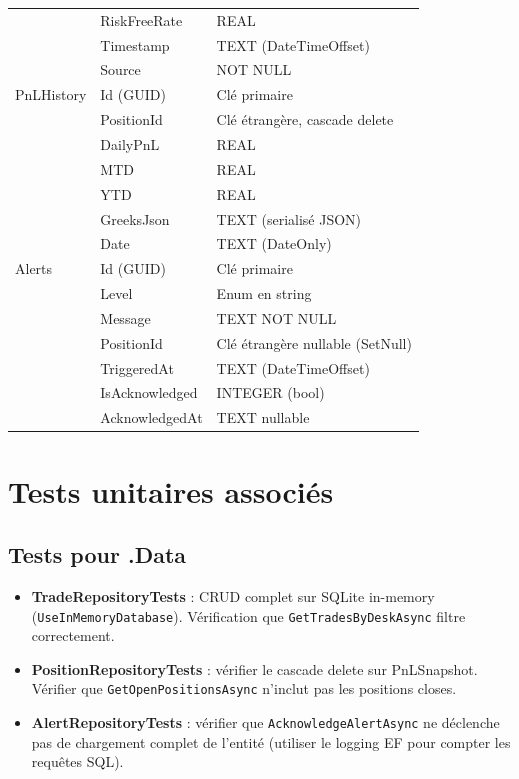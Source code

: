\documentclass[a4paper,11pt]{article}
\newcommand{\cs}[1]{\texttt{\color{codeinline}#1}}
\begin{document}
\begin{center}
\begin{tabularx}{\textwidth}{>{\ttfamily}l >{\ttfamily}l X}
           & RiskFreeRate & REAL \\
           & Timestamp & TEXT (DateTimeOffset) \\
           & Source & NOT NULL \\
\midrule
PnLHistory & Id (GUID) & Clé primaire \\
           & PositionId & Clé étrangère, cascade delete \\
           & DailyPnL & REAL \\
           & MTD & REAL \\
           & YTD & REAL \\
           & GreeksJson & TEXT (serialisé JSON) \\
           & Date & TEXT (DateOnly) \\
\midrule
Alerts & Id (GUID) & Clé primaire \\
       & Level & Enum en string \\
       & Message & TEXT NOT NULL \\
       & PositionId & Clé étrangère nullable (SetNull) \\
       & TriggeredAt & TEXT (DateTimeOffset) \\
       & IsAcknowledged & INTEGER (bool) \\
       & AcknowledgedAt & TEXT nullable \\
\bottomrule
\end{tabularx}
\end{center}


\newpage
\section{Tests unitaires associés}

\subsection{Tests pour .Data}

\begin{itemize}
  \item \textbf{TradeRepositoryTests} : CRUD complet sur SQLite in-memory
        (\cs{UseInMemoryDatabase}). Vérification que \cs{GetTradesByDeskAsync}
        filtre correctement.
  \item \textbf{PositionRepositoryTests} : vérifier le cascade delete sur
        PnLSnapshot. Vérifier que \cs{GetOpenPositionsAsync} n'inclut pas les
        positions closes.
  \item \textbf{AlertRepositoryTests} : vérifier que \cs{AcknowledgeAlertAsync}
        ne déclenche pas de chargement complet de l'entité (utiliser le logging EF
        pour compter les requêtes SQL).
\end{itemize}
\end{document}

